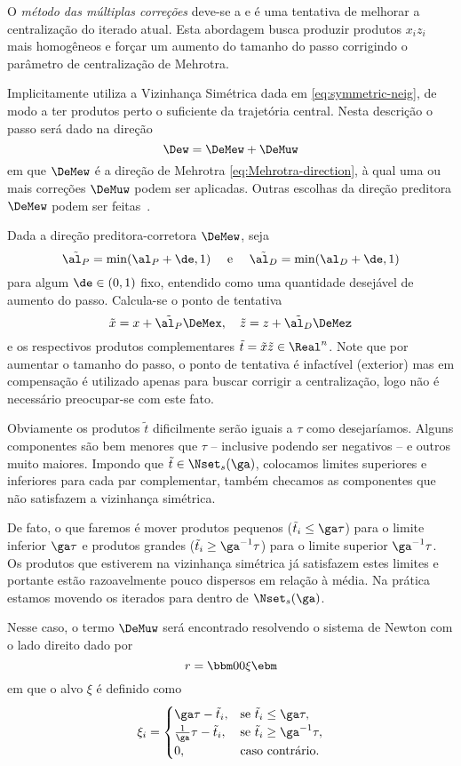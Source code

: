 O \emph{método das múltiplas correções} deve-se a
\citet{Gondzio:1996uw} e é uma tentativa de melhorar a centralização do iterado
atual. Esta abordagem busca produzir produtos $x_iz_i$ mais homogêneos e forçar
um aumento do tamanho do passo corrigindo o parâmetro de centralização de
Mehrotra.

Implicitamente \citet{Gondzio:1996uw} utiliza a Vizinhança Simétrica dada 
em \eqref{eq:symmetric-neig}, de modo a ter produtos perto o suficiente da
trajetória central. Nesta descrição o passo será dado na direção
\[
\Dew = 	\DeMew + \DeMuw
\]
em que $\DeMew$ é a direção de Mehrotra \eqref{eq:Mehrotra-direction}, à qual
uma ou mais correções $\DeMuw$ podem ser aplicadas. Outras escolhas da direção preditora 
$\DeMew$ podem ser
feitas~\cite{Colombo:2008ia}.

Dada a direção preditora-corretora $\DeMew$, seja \[ \tilde{\al_P} =
\min(\al_P+\de, 1) \quad\text{ e }\quad\tilde{\al_D} = \min(\al_D+\de, 1) \]
para algum $\de\in(0,1)$ fixo, entendido como uma quantidade desejável de
aumento do passo. Calcula-se o ponto de tentativa \[
\tilde{x} = x +  \tilde{\al_P} \DeMex,\quad\tilde{z} = z +  \tilde{\al_D}
\DeMez \] e os respectivos produtos complementares $\tilde{t} =
\tilde{x}\tilde{z}\in\Real^n$. Note que por aumentar o tamanho do passo, o
ponto de tentativa é infactível (exterior) mas em compensação é utilizado apenas
para buscar corrigir a centralização,  logo não é necessário preocupar-se
com este fato.

Obviamente os produtos $\tilde{t}$ dificilmente serão iguais a $\tau$ como
desejaríamos. Alguns componentes são bem menores que $\tau$ -- inclusive
podendo ser negativos -- e outros muito maiores. Impondo que
$\tilde{t}\in\Nset_s(\ga)$, colocamos limites superiores e inferiores para cada
par complementar, também checamos as componentes que não satisfazem a
vizinhança simétrica. 

De fato, o que faremos é  mover produtos pequenos
($\tilde{t}_i\leq \ga\tau$) para o limite inferior $\ga\tau$ e produtos grandes
($\tilde{t}_i\geq \ga^{-1}\tau$) para o limite superior $\ga^{-1}\tau$. Os
produtos que estiverem na vizinhança simétrica já satisfazem estes limites e
portante estão razoavelmente pouco dispersos em relação à média. Na prática
estamos movendo os iterados para dentro de $\Nset_s(\ga)$.


Nesse caso, o termo $\DeMuw$ será encontrado resolvendo o sistema de Newton
com o lado direito dado por
\begin{equation}
\label{eq:multiply-correctors-rhs}
r = \bbm 0\\ 0\\ \xi\ebm
\end{equation}
em que o alvo $\xi$ é definido como
\[
\xi_i = 
\begin{cases}
\ga\tau - \tilde{t}_i, & \text{se } \tilde{t}_i\leq \ga\tau,\\
\frac{1}{\ga}\tau -
\tilde{t}_i, & \text{se } \tilde{t}_i\geq \ga^{-1}\tau,\\ 
0, & \text{caso contrário}.
\end{cases}
\]

